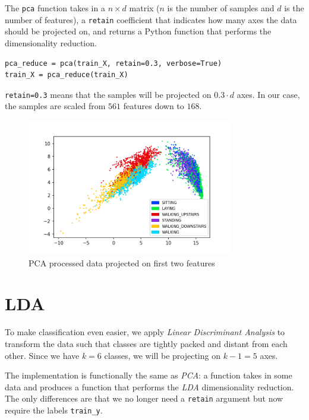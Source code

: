 \documentclass[14pt]{extarticle}
\begin{document}
    The \texttt{pca} function takes in a $n\times d$ matrix ($n$ is
    the number of samples and $d$ is the number of features), a
    \texttt{retain} coefficient that indicates how many axes the
    data should be projected on, and returns a Python function that performs the
    dimensionality reduction.

    \begin{verbatim}
pca_reduce = pca(train_X, retain=0.3, verbose=True)
train_X = pca_reduce(train_X)
    \end{verbatim}

    \texttt{retain=0.3} means that the samples will be projected on
    $0.3\cdot d$ axes. In our case, the samples are scaled from $561$ features
    down to $168$.

    \begin{figure}[H]
        \centering
        \includegraphics[width=0.8\textwidth]{img/pca_3.png}
        \caption{PCA processed data projected on first two features}
    \end{figure}

    \section{LDA}
    To make classification even easier, we apply \emph{Linear Discriminant
    Analysis} to transform the data such that classes are tightly packed and
    distant from each other. Since we have $k=6$ classes, we will be projecting
    on $k-1=5$ axes.

    The implementation is functionally the same as \emph{PCA}: a function takes
    in some data and produces a function that performs the \emph{LDA}
    dimensionality reduction. The only differences are that we no longer need a
    \texttt{retain} argument but now require the labels
    \texttt{train_y}.
\end{document}

